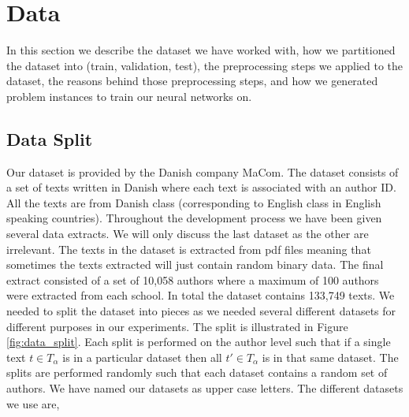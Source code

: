 \section{Data} \label{sec:data}

In this section we describe the dataset we have worked with, how we partitioned
the dataset into (train, validation, test), the preprocessing steps we applied
to the dataset, the reasons behind those preprocessing steps, and how we
generated problem instances to train our neural networks on.


\subsection{Data Split}

Our dataset is provided by the Danish company MaCom. The dataset consists of a
set of texts written in Danish where each text is associated with an author ID.
All the texts are from Danish class (corresponding to English class in English
speaking countries). Throughout the development process we have been given
several data extracts. We will only discuss the last dataset as the other are
irrelevant. The texts in the dataset is extracted from pdf files meaning that
sometimes the texts extracted will just contain random binary data. The final
extract consisted of a set of 10,058 authors where a maximum of 100 authors were
extracted from each school. In total the dataset contains 133,749 texts. We
needed to split the dataset into pieces as we needed several different datasets
for different purposes in our experiments. The split is illustrated in Figure
\ref{fig:data_split}. Each split is performed on the author level such that
if a single text $t \in T_\alpha$ is in a particular dataset then all $t' \in
T_\alpha$ is in that same dataset. The splits are performed randomly such that
each dataset contains a random set of authors. We have named our datasets as
upper case letters. The different datasets we use are,

